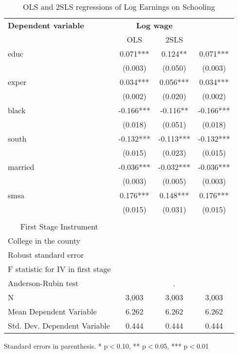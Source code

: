\begin{table}[htbp]\centering
\scriptsize
\caption{OLS and 2SLS regressions of Log Earnings on Schooling}
\label{2sls_1}
\begin{center}
\begin{threeparttable}
\begin{tabular}{l*{3}{c}}
\toprule
\multicolumn{1}{l}{\textbf{Dependent variable}}&
\multicolumn{2}{c}{\textbf{Log wage}}\\
\multicolumn{1}{c}{}&
\multicolumn{1}{c}{OLS}&
\multicolumn{1}{c}{2SLS}\\
\midrule
educ                &       0.071***&       0.124** &       0.071***\\
                    &     (0.003)   &     (0.050)   &     (0.003)   \\
exper               &       0.034***&       0.056***&       0.034***\\
                    &     (0.002)   &     (0.020)   &     (0.002)   \\
black               &      -0.166***&      -0.116** &      -0.166***\\
                    &     (0.018)   &     (0.051)   &     (0.018)   \\
south               &      -0.132***&      -0.113***&      -0.132***\\
                    &     (0.015)   &     (0.023)   &     (0.015)   \\
married             &      -0.036***&      -0.032***&      -0.036***\\
                    &     (0.003)   &     (0.005)   &     (0.003)   \\
smsa                &       0.176***&       0.148***&       0.176***\\
                    &     (0.015)   &     (0.031)   &     (0.015)   \\
\\
\midrule
\multicolumn{1}{c}{First Stage Instrument}\\
College in the county&               &               &               \\
Robust standard error &               &               &               \\
F statistic for IV in first stage&               &               &               \\
Anderson-Rubin test &               &           .   &               \\
N                   &       3,003   &       3,003   &       3,003   \\
Mean Dependent Variable&       6.262   &       6.262   &       6.262   \\
Std. Dev. Dependent Variable&       0.444   &       0.444   &       0.444   \\
\bottomrule
\end{tabular}
\begin{tablenotes}
\tiny
\item Standard errors in parenthesis. * p$<$0.10, ** p$<$0.05, *** p$<$0.01
\end{tablenotes}
\end{threeparttable}
\end{center}
\end{table}
